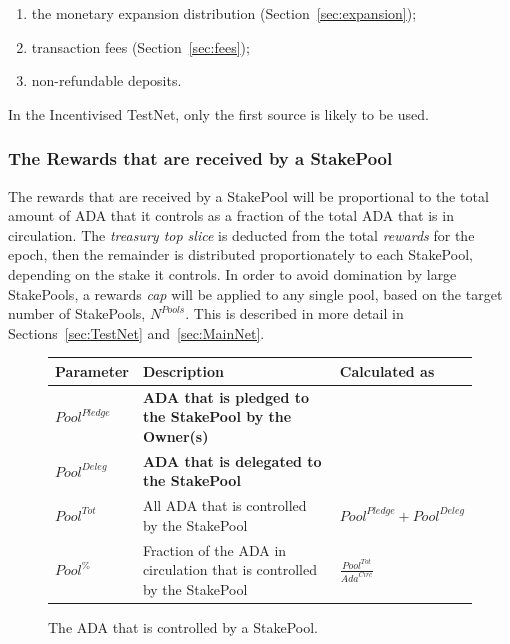 \documentclass[11pt,a4paper,dvipsnames,twosided,final]{article}
\newcommand{\ada}{ADA{}}
\begin{document}
\begin{enumerate}
\item
  the monetary expansion distribution (Section~\ref{sec:expansion});
\item
  transaction fees (Section~\ref{sec:fees});
\item
  non-refundable deposits.
\end{enumerate}

\noindent
In the Incentivised TestNet, only the first source is likely to be used.

\subsubsection*{The Rewards that are received by a StakePool}

The rewards that are received by a StakePool will be proportional to the total amount of \ada{} that it controls
as a fraction of the total \ada{} that is in circulation.  The \emph{treasury top slice} is deducted from the total \emph{rewards}
for the epoch, then the remainder is distributed proportionately to each StakePool, depending on the stake it controls.  In order to avoid domination by large StakePools,
a rewards \emph{cap} will be applied to any single pool, based on the target number of StakePools, $N^{\textit{Pools}}$.
This is described in more detail in Sections~\ref{sec:TestNet} and~\ref{sec:MainNet}.

\clearpage
\begin{figure}[h!]
\begin{center}
\begin{tabular}{||l|p{9cm}|l||}
  \hline \hline
\textbf{Parameter} & \textbf{Description} & \textbf{Calculated as} \\\hline
\textbf{\color{red} ${\textit{Pool}}^\textit{Pledge}$} & \textbf{\color{red} \ada{} that is pledged to the StakePool by the Owner(s)} & \\\hline
\textbf{\color{blue} ${\textit{Pool}}^\textit{Deleg}$} & \textbf{\color{blue}  \ada{} that is delegated to the StakePool} & \\\hline
${\textit{Pool}}^{Tot}$ & All \ada{} that is controlled by the StakePool & ${\textit{Pool}}^\textit{Pledge} + {\textit{Pool}}^\textit{Deleg}$ \\\hline
${\textit{Pool}}^\%$ & Fraction of the \ada{} in circulation that is controlled by the StakePool & {\large $\frac{{\textit{Pool}}^{Tot}}{\textit{Ada}^{\textit{Circ}}}$} \\\hline
  \hline
\end{tabular}
\end{center}
\caption{The \ada{} that is controlled by a StakePool.}
\end{figure}
\end{document}
